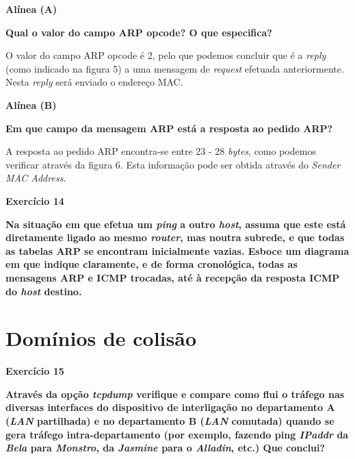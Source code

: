 \documentclass{article}
\begin{document}
\vspace{0.5cm}

\textbf{Alínea (A)}

\textbf{Qual o valor do campo ARP opcode? O que especifica?}\vspace{0.35cm}

\hspace{0.5cm}O valor do campo ARP opcode é 2, pelo que podemos concluir que é a \textit{reply} (como indicado na figura 5) a uma mensagem de \textit{request} efetuada anteriormente. Nesta \textit{reply} será enviado o endereço MAC.\vspace{0.5cm}

\textbf{Alínea (B)}

\textbf{Em que campo da mensagem ARP está a resposta ao pedido ARP?}\vspace{0.35cm}

\hspace{0.5cm}A resposta ao pedido ARP encontra-se entre 23 - 28 \textit{bytes}, como podemos verificar através da figura 6. Esta informação pode ser obtida através do \textit{Sender MAC Address}.

\vspace{0.5cm}
\textbf{Exercício 14}\vspace{0.5cm}

\textbf{Na situação em que efetua um \textit{ping} a outro \textit{host}, assuma que este está diretamente ligado ao mesmo \textit{router}, mas noutra
subrede, e que todas as tabelas ARP se encontram inicialmente vazias. Esboce um diagrama em que indique claramente,
e de forma cronológica, todas as mensagens ARP e ICMP trocadas, até à recepção da resposta ICMP do \textit{host} destino.}


\vspace{0.5cm}

\section{Domínios de colisão}\vspace{0.5cm}

\textbf{Exercício 15}\vspace{0.5cm}

\textbf{Através da opção \textit{tcpdump} verifique e compare como flui o tráfego nas diversas interfaces do dispositivo de interligação
no departamento A (\textit{LAN} partilhada) e no departamento B (\textit{LAN} comutada) quando se gera tráfego intra-departamento (por
exemplo, fazendo ping \textit{IPaddr} da \textit{Bela} para \textit{Monstro}, da \textit{Jasmine} para o \textit{Alladin}, etc.) Que conclui?}
\end{document}
